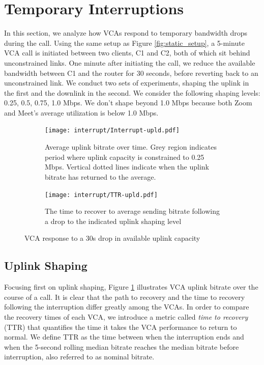 

\section{Temporary Interruptions}
\label{sec:interruption}
In this section, we analyze how VCAs respond to temporary bandwidth drops during the call. Using the same setup as Figure \ref{fig:static_setup}, a 5-minute VCA call is initiated between two clients, C1 and C2, both of which sit behind unconstrained links. One minute after initiating the call, we reduce the available bandwidth between C1 and the router for 30 seconds, before reverting back to an unconstrained link. We conduct two sets of experiments, shaping the uplink in the first and the downlink in the second. We consider the following shaping levels: {0.25, 0.5, 0.75, 1.0} Mbps. We don't shape beyond 1.0 Mbps because both Zoom and Meet's average utilization is below 1.0 Mbps.

\begin{figure}[t!]
\centering
\begin{subfigure}[t]{.5\textwidth}
    \centering
    \texttt{[image: interrupt/Interrupt-upld.pdf]}
    \caption{Average uplink bitrate over time. Grey region indicates period where uplink capacity is constrained to 0.25 Mbps. Vertical dotted lines indicate when the uplink bitrate has returned to the average.}
    \label{fig:ts_upld}
\end{subfigure}\hfill
\begin{subfigure}[t]{.5\textwidth}
      \centering
    \texttt{[image: interrupt/TTR-upld.pdf]}
    \caption{The time to recover to average sending bitrate following a drop to the indicated uplink shaping level}
    \label{fig:TTR_upld}
\end{subfigure}
\caption{VCA response to a 30s drop in available uplink capacity}
\label{fig:interrupt-upld}
\end{figure}

\subsection{Uplink Shaping}
Focusing first on uplink shaping, Figure \ref{fig:ts_upld} illustrates VCA uplink bitrate over the course of a call. It is clear that the path to recovery and the time to recovery following the interruption differ greatly among the VCAs. In order to compare the recovery times of each VCA, we introduce a metric called \textit{time to recovery} (TTR) that quantifies the time it takes the VCA performance to return to normal. We define TTR as the time between when the interruption ends and when the 5-second rolling median bitrate reaches the median bitrate before interruption, also referred to as nominal bitrate. %

